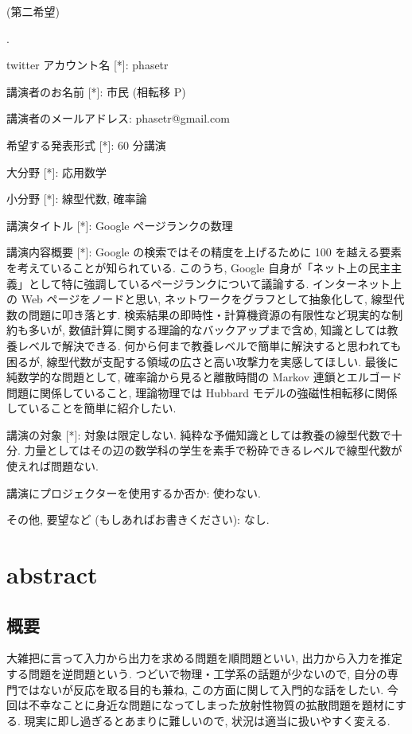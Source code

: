 \documentclass[openany, a4paper, oneside]{book}
\newcounter{enum2}
\renewenvironment{enumerate}{%
\begin{list}%
{%
\arabic{enum2}.\ \,%
}%
{%
\usecounter{enum2}
\setlength{\itemindent}{0pt}%
\setlength{\leftmargin}{6pt}%
\setlength{\rightmargin}{0pt}%
\setlength{\labelsep}{0pt}%
\setlength{\labelwidth}{6pt}%
\setlength{\itemsep}{0pt}%
\setlength{\parsep}{0pt}%
\setlength{\listparindent}{0pt}%
}
}{%
\end{list}%
}
\theoremstyle{break}
\theoremstyle{breakdefn}
\begin{document}
(第二希望)
\begin{enumerate}
\item twitter アカウント名 [*]: phasetr
\item 講演者のお名前 [*]: 市民 (相転移 P)
\item 講演者のメールアドレス: phasetr@gmail.com
\item 希望する発表形式 [*]: 60 分講演
\item 大分野 [*]: 応用数学
\item 小分野 [*]: 線型代数, 確率論
\item 講演タイトル [*]: Google ページランクの数理
\item 講演内容概要 [*]: Google の検索ではその精度を上げるために 100 を越える要素を考えていることが知られている.
   このうち, Google 自身が「ネット上の民主主義」として特に強調しているページランクについて議論する.
   インターネット上の Web ページをノードと思い,
   ネットワークをグラフとして抽象化して, 線型代数の問題に叩き落とす.
   検索結果の即時性・計算機資源の有限性など現実的な制約も多いが,
   数値計算に関する理論的なバックアップまで含め, 知識としては教養レベルで解決できる.
   何から何まで教養レベルで簡単に解決すると思われても困るが,
   線型代数が支配する領域の広さと高い攻撃力を実感してほしい.
   最後に純数学的な問題として, 確率論から見ると離散時間の Markov 連鎖とエルゴード問題に関係していること,
   理論物理では Hubbard モデルの強磁性相転移に関係していることを簡単に紹介したい.
\item 講演の対象 [*]: 対象は限定しない.
    純粋な予備知識としては教養の線型代数で十分.
    力量としてはその辺の数学科の学生を素手で粉砕できるレベルで線型代数が使えれば問題ない.
\item 講演にプロジェクターを使用するか否か: 使わない.
\item その他, 要望など (もしあればお書きください): なし.
\end{enumerate}
\section{abstract}
\label{sec-7-9-2}
\subsection{概要}
\label{sec-7-9-2-1}

大雑把に言って入力から出力を求める問題を順問題といい,
出力から入力を推定する問題を逆問題という.
つどいで物理・工学系の話題が少ないので, 自分の専門ではないが反応を取る目的も兼ね,
この方面に関して入門的な話をしたい.
今回は不幸なことに身近な問題になってしまった放射性物質の拡散問題を題材にする.
現実に即し過ぎるとあまりに難しいので, 状況は適当に扱いやすく変える.
\end{document}
